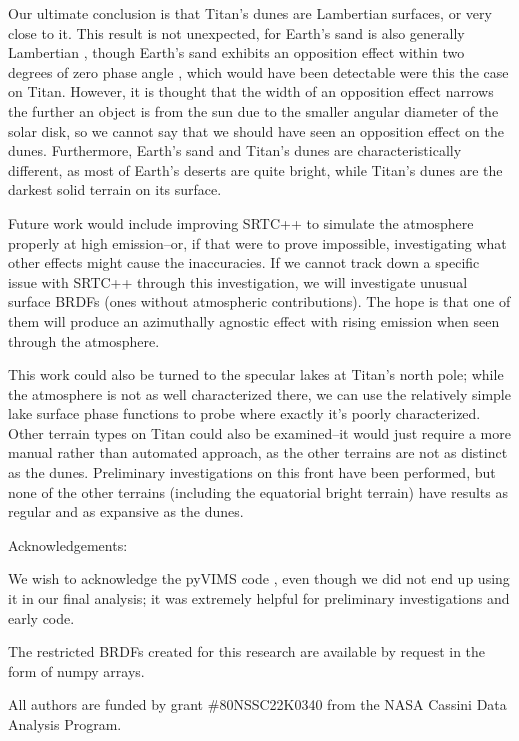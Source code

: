 \documentclass[twocolumn,linenumbers]{aastex631}
\begin{document}
Our ultimate conclusion is that Titan's dunes are Lambertian surfaces, or very close to it. This result is not unexpected, for Earth's sand is also generally Lambertian \citep{Hapke1963}, though Earth's sand exhibits an opposition effect within two degrees of zero phase angle \citep{Wise2022}, which would have been detectable were this the case on Titan. However, it is thought that the width of an opposition effect narrows the further an object is from the sun \citep{Karkoschka2012} due to the smaller angular diameter of the solar disk, so we cannot say that we should have seen an opposition effect on the dunes. Furthermore, Earth's sand and Titan's dunes are characteristically different, as most of Earth's deserts are quite bright, while Titan's dunes are the darkest solid terrain on its surface.

Future work would include improving SRTC++ to simulate the atmosphere properly at high emission--or, if that were to prove impossible, investigating what other effects might cause the inaccuracies. If we cannot track down a specific issue with SRTC++ through this investigation, we will investigate unusual surface BRDFs (ones without atmospheric contributions). The hope is that one of them will produce an azimuthally agnostic effect with rising emission when seen through the atmosphere.

This work could also be turned to the specular lakes at Titan's north pole; while the atmosphere is not as well characterized there, we can use the relatively simple lake surface phase functions to probe where exactly it's poorly characterized. Other terrain types on Titan could also be examined--it would just require a more manual rather than automated approach, as the other terrains are not as distinct as the dunes. Preliminary investigations on this front have been performed, but none of the other terrains (including the equatorial bright terrain) have results as regular and as expansive as the dunes.

\begin{acknowledgments}

Acknowledgements:

We wish to acknowledge the pyVIMS code \citep{Seignovert2021}, even though we did not end up using it in our final analysis; it was extremely helpful for preliminary investigations and early code.

The restricted BRDFs created for this research are available by request in the form of numpy arrays.

All authors are funded by grant \#80NSSC22K0340 from the NASA Cassini Data Analysis Program.

\end{acknowledgments}

\label{ACK}

{}


\end{document}
